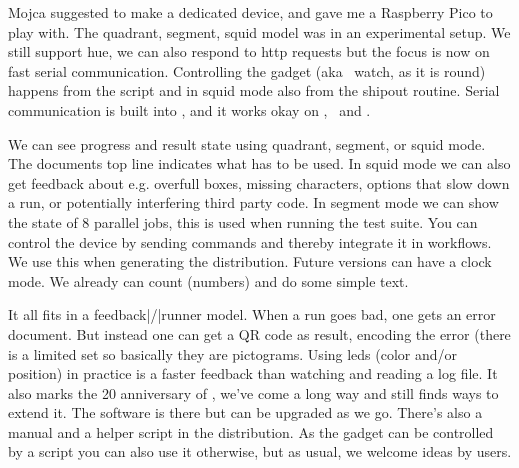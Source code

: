 \stoptitle

\starttitle[title=From leds to gadget]

\startitemize
\startitem
    Mojca suggested to make a dedicated device, and gave me a Raspberry Pico
    to play with.
\stopitem
\startitem
    The quadrant, segment, squid model was  in an experimental
    setup.
\stopitem
\startitem
    We still support hue, we can also respond to http requests but the focus is
    now on fast serial communication.
\stopitem
\startitem
    Controlling the gadget (aka \CONTEXT\ watch, as it is round) happens from
    the  script and in squid mode also from the shipout routine.
\stopitem
\startitem
    Serial communication is built into \LUAMETATEX, and it works okay on
    \WINDOWS, \LINUX\ and \OSX.
\stopitem
\stopitemize

\stoptitle

\starttitle[title=From gadget to tool]

\startitemize
\startitem
    We can see progress and result state using quadrant, segment, or squid mode.
    The documents top line indicates what has to be used.
\stopitem
\startitem
    In squid mode we can also get feedback about e.g. overfull boxes, missing
    characters, options that slow down a run, or potentially interfering
    third party code.
\stopitem
\startitem
    In segment mode we can show the state of 8 parallel jobs, this is used when
    running the test suite.
\stopitem
\startitem
    You can control the device by sending commands and thereby integrate it
    in workflows. We use this when generating the distribution.
\stopitem
\startitem
    Future versions can have a clock mode. We already can count (numbers) and do
    some simple text.
\stopitem
\stopitemize

\stoptitle

\starttitle[title=How it fits in]

\startitemize
\startitem
    It all fits in a feedback|/|runner model. When a run goes bad, one gets
    an error document.
\stopitem
\startitem
    But instead one can get a QR code as result, encoding the error (there
    is a limited set so basically they are pictograms.
\stopitem
\startitem
    Using leds (color and/or position) in practice is a faster feedback than
    watching and reading a log file.
\stopitem
\startitem
    It also marks the 20 anniversary of \LUATEX, we've come a long
    way and still finds ways to extend it.
\stopitem
\startitem
    The software is there but can be upgraded as we go. There's also a manual
    and a helper script in the distribution.
\stopitem
\startitem
    As the gadget can be controlled by a script you can also use it otherwise,
    but as usual, we welcome ideas by users.
\stopitem
\stopitemize

